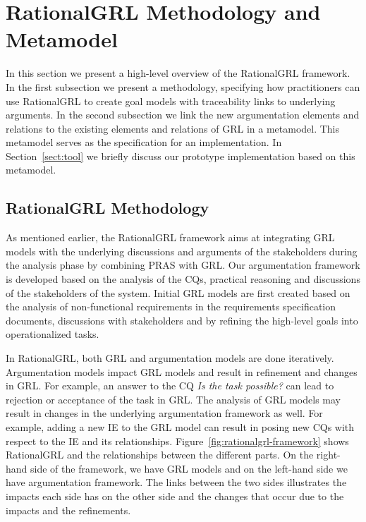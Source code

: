 \section{RationalGRL Methodology and Metamodel}
\label{sect:overview}

In this section we present a high-level overview of the RationalGRL framework. In the first subsection we present a methodology, specifying how practitioners can use RationalGRL to create goal models with traceability links to underlying arguments. In the second subsection we link the new argumentation elements and relations to the existing elements and relations of GRL in a metamodel. This metamodel serves as the specification for an implementation. In Section~\ref{sect:tool} we briefly discuss our prototype implementation based on this metamodel.

\subsection{RationalGRL Methodology}

As mentioned earlier, the RationalGRL framework aims at integrating GRL models with the underlying discussions and arguments of the stakeholders during the analysis phase by combining PRAS with GRL. Our argumentation framework is developed based on the analysis of the CQs, practical reasoning and discussions of the stakeholders of the system. Initial GRL models are first created based on the analysis of non-functional requirements in the requirements specification documents, discussions with stakeholders and by refining the high-level goals into operationalized tasks. 

In RationalGRL, both GRL and argumentation models are done iteratively. Argumentation models impact GRL models and result in refinement and changes in GRL. For example, an answer to the CQ \emph{Is the task possible?} can lead to rejection or acceptance of the task in GRL. The analysis of GRL models may result in changes in the underlying argumentation framework as well. For example, adding a new IE to the GRL model can result in posing new CQs with respect to the IE and its relationships. Figure~\ref{fig:rationalgrl-framework} shows RationalGRL and the relationships between the different parts. On the right-hand side of the framework, we have GRL models and on the left-hand side we have argumentation framework. The links between the two sides illustrates the impacts each side has on the other side and the changes that occur due to the impacts and the refinements. 

